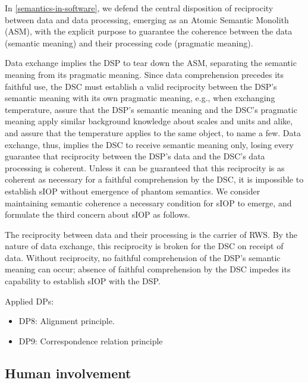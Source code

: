 \documentclass[sort&compress,preprint,3p,authoryear,twocolumn]{elsarticle}
\providecommand{\tightlist}{%
  \setlength{\itemsep}{0pt}\setlength{\parskip}{0pt}}
\theoremstyle{break}			%
\begin{document}
In \cref{semantics-in-software}, we defend the central disposition of
reciprocity between data and data processing, emerging as an Atomic
Semantic Monolith (ASM), with the explicit purpose to guarantee the
coherence between the data (semantic meaning) and their processing code
(pragmatic meaning).

Data exchange implies the DSP to tear down the ASM, separating the
semantic meaning from its pragmatic meaning. Since data comprehension
precedes its faithful use, the DSC must establish a valid reciprocity
between the DSP's semantic meaning with its own pragmatic meaning, e.g.,
when exchanging temperature, assure that the DSP's semantic meaning and
the DSC's pragmatic meaning apply similar background knowledge about
scales and units and alike, and assure that the temperature applies to
the same object, to name a few. Data exchange, thus, implies the DSC to
receive semantic meaning only, losing every guarantee that reciprocity
between the DSP's data and the DSC's data processing is coherent. Unless
it can be guaranteed that this reciprocity is as coherent as necessary
for a faithful comprehension by the DSC, it is impossible to establish
sIOP without emergence of phantom semantics. We consider maintaining
semantic coherence a necessary condition for sIOP to emerge, and
formulate the third concern about sIOP as follows.

\begin{mmconcern}\label{cncrn:re-establish-coherence}
The reciprocity between data and their processing is the carrier of RWS. By the nature of data exchange, this reciprocity is broken for the DSC on receipt of data. Without reciprocity, no faithful comprehension of the DSP’s semantic meaning can occur; absence of faithful comprehension by the DSC impedes its capability to establish sIOP with the DSP.
\end{mmconcern}

Applied DPs:

\begin{itemize}
\tightlist
\item
  DP8: Alignment principle.\\
\item
  DP9: Correspondence relation principle
\end{itemize}

\subsection{Human involvement}\label{human-involvement}
\end{document}
